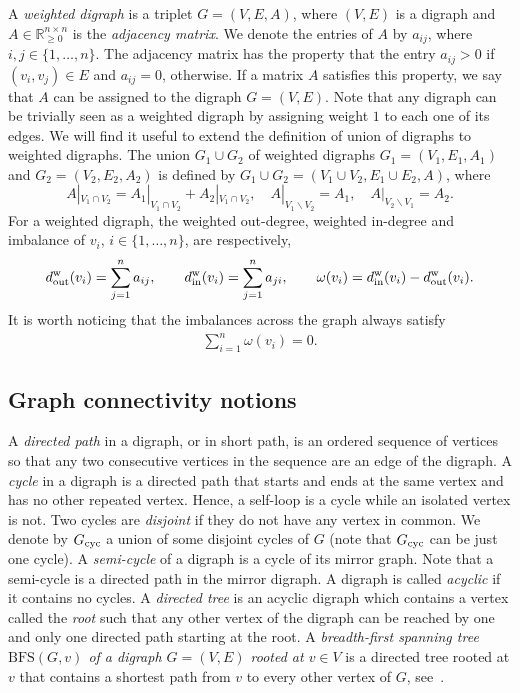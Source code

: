 \documentclass[final]{siamltex}
\begin{document}
A \emph{weighted digraph} is a triplet $ G=(V,E,A) $, where $ (V,E) $
is a digraph and $ A \in \mathbb{R}^{n\times n}_{\geq0} $ is the
\emph{adjacency matrix}. We denote the entries of $ A $ by $ a_{ij} $,
where $ i,j\in\{1,\ldots,n \} $. The adjacency matrix has the property
that the entry $ a_{ij}>0 $ if $ (v_i,v_j)\in E $ and $ a_{ij}=0 $,
otherwise. If a matrix $A$ satisfies this property, we say that $ A $
can be assigned to the digraph $ G=(V,E)$.
Note that any digraph can be trivially seen as a weighted digraph by
assigning weight $1$ to each one of its edges. We will find it useful
to extend the definition of union of digraphs to weighted digraphs.
The union $G_1\cup G_2 $ of weighted digraphs $ G_1=(V_1,E_1,A_1) $
and $ G_2=(V_2,E_2,A_2) $ is defined by $G_1\cup G_2=(V_1\cup V_2,
E_1\cup E_2, A)$, where
\[
A|_{V_1\cap V_2}=A_1|_{V_1\cap V_2}+A_2|_{V_1\cap V_2},\quad
A|_{V_1\backslash V_2}=A_1, \quad A|_{V_2\backslash V_1}=A_2.
\]
For a weighted digraph, the weighted out-degree, weighted in-degree
and imbalance of $v_i$, $i \in \{1,\dots,n\}$, are respectively,
\[
{{{d}_{\textup{{out}}}^{\textup{{w}}}}}(v_i) =\sum_{j=1}^{n}a_{ij}, \qquad {{{d}_{\textup{{in}}}^{\textup{{w}}}}}(v_i)=\sum_{j=1}^n
a_{ji} , \qquad \omega(v_i)={{{d}_{\textup{{in}}}^{\textup{{w}}}}}(v_i)-{{{d}_{\textup{{out}}}^{\textup{{w}}}}}(v_i).
\]
It is worth noticing that the imbalances across the graph always satisfy
\begin{align}
  \label{eq:basic-fact}
   \sum_{i=1}^n \omega(v_i) = 0.
\end{align}

\subsection{Graph connectivity notions}

A \emph{directed path} in a digraph, or in short path, is an ordered
sequence of vertices so that any two consecutive vertices in the
sequence are an edge of the digraph. A \emph{cycle} in a digraph is a
directed path that starts and ends at the same vertex and has no other
repeated vertex.  Hence, a self-loop is a cycle while an isolated
vertex is not.  Two cycles are \emph{disjoint} if they do not have any
vertex in common.  We denote by ${{G}_{\textup{{cyc}}}}$ a union of some
disjoint cycles of $G$ (note that ${{G}_{\textup{{cyc}}}}$ can be just one
cycle).  A \emph{semi-cycle} of a digraph is a cycle of its mirror
graph.  Note that a semi-cycle is a directed path in the mirror
digraph.  A digraph is called \emph{acyclic} if it contains no
cycles. A \emph{directed tree} is an acyclic digraph which contains a
vertex called the \emph{root} such that any other vertex of the
digraph can be reached by one and only one directed path starting at
the root. A \emph{breadth-first spanning tree $ \mathrm{BFS}(G,v) $ of
  a digraph $ G=(V,E) $ rooted at $ v \in V $} is a directed tree
rooted at $ v $ that contains a shortest path from $ v $ to every
other vertex of $ G $, see~\cite{FB-JC-SM:08cor, GT:01}.
\end{document}
